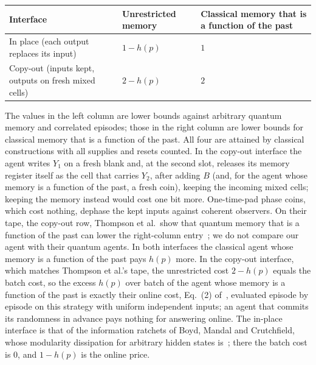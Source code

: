 \documentclass[11pt]{article}
\theoremstyle{definition}
\theoremstyle{remark}
\begin{document}
\begin{center}
\begin{tabular}{>{\raggedright\arraybackslash}p{6.2cm}>{\centering\arraybackslash}p{3.3cm}>{\centering\arraybackslash}p{3.6cm}}
\toprule
Interface & Unrestricted memory & Classical memory that is a function of the past\\
\midrule
In place (each output replaces its input) & $1-h(p)$ & $1$\\
Copy-out (inputs kept, outputs on fresh mixed cells) & $2-h(p)$ & $2$\\
\bottomrule
\end{tabular}
\end{center}

The values in the left column are lower bounds against arbitrary quantum memory and correlated episodes; those in the right column are lower bounds for classical memory that is a function of the past. All four are attained by classical constructions with all supplies and resets counted. In the copy-out interface the agent writes $Y_1$ on a fresh blank and, at the second slot, releases its memory register itself as the cell that carries $Y_2$, after adding $B$ (and, for the agent whose memory is a function of the past, a fresh coin), keeping the incoming mixed cells; keeping the memory instead would cost one bit more. One-time-pad phase coins, which cost nothing, dephase the kept inputs against coherent observers. On their tape, the copy-out row, Thompson et al.\ show that quantum memory that is a function of the past can lower the right-column entry~\cite[Result~2]{Thompson25}; we do not compare our agent with their quantum agents. In both interfaces the classical agent whose memory is a function of the past pays $h(p)$ more. In the copy-out interface, which matches Thompson et al.'s tape, the unrestricted cost $2-h(p)$ equals the batch cost, so the excess $h(p)$ over batch of the agent whose memory is a function of the past is exactly their online cost, Eq.~(2) of~\cite{Thompson25}, evaluated episode by episode on this strategy with uniform independent inputs; an agent that commits its randomness in advance pays nothing for answering online. The in-place interface is that of the information ratchets of Boyd, Mandal and Crutchfield, whose modularity dissipation for arbitrary hidden states is~\cite[Eq.~(14)]{BMC18}; there the batch cost is $0$, and $1-h(p)$ is the online price.
\end{document}
